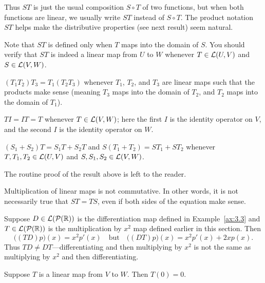 Thus $ST$ is just the usual composition $S\circ T$ of two functions, but when
both functions are linear, we usually write $ST$ instead of $S\circ T$. The
product notation $ST$ helps make the distributive properties (see next result)
seem natural.

Note that $ST$ is defined only when $T$ maps into the domain of $S$. You should
verify that $ST$ is indeed a linear map from $U$ to $W$ whenever
$T\in\mathcal{L}(U,V)$ and $S\in\mathcal{L}(V,W)$.

\begin{result}\label{ax:3.8}\leavevmode
\begin{axprops}
\item[associativity] $(T_1T_2)T_3=T_1(T_2T_3)$ whenever $T_1$, $T_2$, and
  $T_3$ are linear maps such that the products make sense (meaning $T_3$ maps
  into the domain of $T_2$, and $T_2$ maps into the domain of $T_1$).
\item[identity] $TI=IT=T$ whenever $T\in\mathcal{L}(V,W)$; here the first $I$ is the
  identity operator on $V$, and the second $I$ is the identity operator on
  $W$.
\item[distributive properties] $(S_1+S_2)T=S_1T+S_2T$ and
  $S(T_1+T_2)=ST_1+ST_2$ whenever $T,T_1,T_2\in\mathcal{L}(U,V)$ and
  $S,S_1,S_2\in\mathcal{L}(V,W)$.
\end{axprops}
\end{result}

The routine proof of the result above is left to the reader.

Multiplication of linear maps is not commutative. In other words, it is not
necessarily true that $ST=TS$, even if both sides of the equation make sense.

\begin{example}\label{ax:3.9}
Suppose $D\in\mathcal{L}(\mathcal{P}(\mathbb{R}))$ is the differentiation map defined in
Example~\ref{ax:3.3} and $T\in\mathcal{L}(\mathcal{P}(\mathbb{R}))$ is the multiplication by $x^2$
map defined earlier in this section. Then
\[ \bigl((TD)p\bigr)(x)=x^2p'(x) \quad\text{but}\quad
   \bigl((DT)p\bigr)(x)=x^2p'(x)+2xp(x). \]
Thus $TD\ne DT$---differentiating and then multiplying by $x^2$ is not the
same as multiplying by $x^2$ and then differentiating.
\end{example}

\begin{result}\label{ax:3.10}
Suppose $T$ is a linear map from $V$ to $W$. Then $T(0)=0$.
\end{result}

